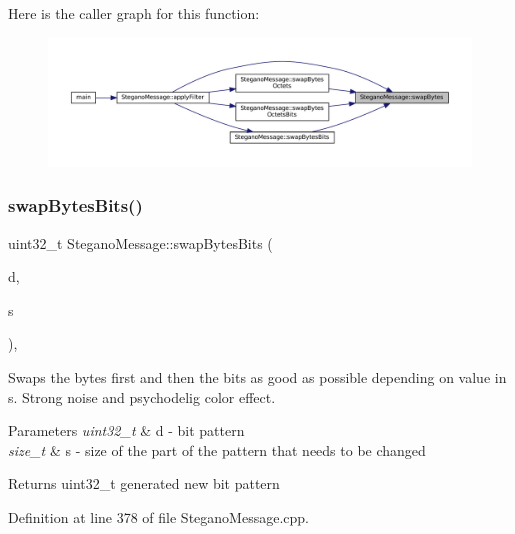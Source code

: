 Here is the caller graph for this function\+:\nopagebreak
\begin{figure}[H]
\begin{center}
\leavevmode
\includegraphics[width=350pt]{classSteganoMessage_af80189e6fb64aa4ae6cc48f92eaec147_icgraph}
\end{center}
\end{figure}
\mbox{\label{classSteganoMessage_a67f4f4c91ecddb89368c4b9cc42ac07e}} 
\subsubsection{\texorpdfstring{swapBytesBits()}{swapBytesBits()}}
{\footnotesize\ttfamily uint32\+\_\+t Stegano\+Message\+::swap\+Bytes\+Bits (\begin{DoxyParamCaption}\item[{uint32\+\_\+t}]{d,  }\item[{size\+\_\+t}]{s }\end{DoxyParamCaption})\hspace{0.3cm}{\ttfamily [static]}, {\ttfamily [private]}}



Swaps the bytes first and then the bits as good as possible depending on value in s. Strong noise and psychodelig color effect. 


\begin{DoxyParams}{Parameters}
{\em uint32\+\_\+t} & d -\/ bit pattern \\
\hline
{\em size\+\_\+t} & s -\/ size of the part of the pattern that needs to be changed \\
\hline
\end{DoxyParams}
\begin{DoxyReturn}{Returns}
uint32\+\_\+t generated new bit pattern 
\end{DoxyReturn}


Definition at line 378 of file Stegano\+Message.\+cpp.

